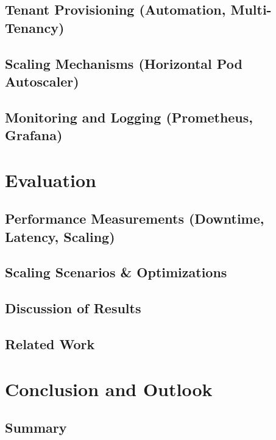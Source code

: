 \documentclass[11pt, a4paper, oneside, draft]{scrartcl}
\begin{document}
        \subsection[Tenant Provisioning]{Tenant Provisioning (Automation, Multi-Tenancy)}

        \subsection[Scaling Mechanisms]{Scaling Mechanisms (Horizontal Pod Autoscaler)}

        \subsection[Monitoring and Logging]{Monitoring and Logging (Prometheus, Grafana)}

    \section{Evaluation}

        \subsection[Performance Measurements]{Performance Measurements (Downtime, Latency, Scaling)}

        \subsection{Scaling Scenarios \& Optimizations}

        \subsection{Discussion of Results}

        \subsection{Related Work}

    \section{Conclusion and Outlook}

        \subsection{Summary}
\end{document}
